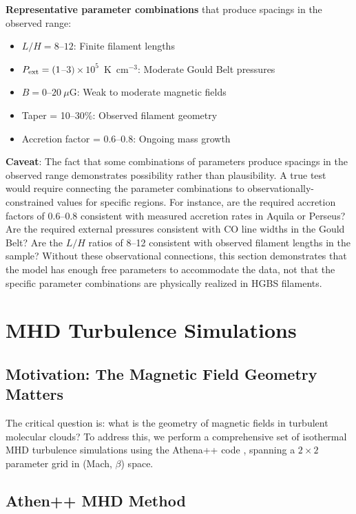 \documentclass[11pt,a4paper]{article}
\begin{document}
\textbf{Representative parameter combinations} that produce spacings in the observed range:
\begin{itemize}
    \item $L/H = 8$--$12$: Finite filament lengths
    \item $P_{\rm ext} = (1$--$3) \times 10^5$~K~cm$^{-3}$: Moderate Gould Belt pressures
    \item $B = 0$--$20~\mu$G: Weak to moderate magnetic fields
    \item Taper = 10--30\%: Observed filament geometry
    \item Accretion factor = 0.6--0.8: Ongoing mass growth
\end{itemize}

\textbf{Caveat}: The fact that some combinations of parameters produce spacings in the observed range demonstrates possibility rather than plausibility. A true test would require connecting the parameter combinations to observationally-constrained values for specific regions. For instance, are the required accretion factors of 0.6--0.8 consistent with measured accretion rates in Aquila or Perseus? Are the required external pressures consistent with CO line widths in the Gould Belt? Are the $L/H$ ratios of 8--12 consistent with observed filament lengths in the sample? Without these observational connections, this section demonstrates that the model has enough free parameters to accommodate the data, not that the specific parameter combinations are physically realized in HGBS filaments.

\section{MHD Turbulence Simulations}
\label{sec:mhd}

\subsection{Motivation: The Magnetic Field Geometry Matters}

The critical question is: what is the geometry of magnetic fields in turbulent molecular clouds? To address this, we perform a comprehensive set of isothermal MHD turbulence simulations using the Athena++ code \citep{Stone2020}, spanning a $2\times2$ parameter grid in (Mach, $\beta$) space.

\subsection{Athen++ MHD Method}
\end{document}
